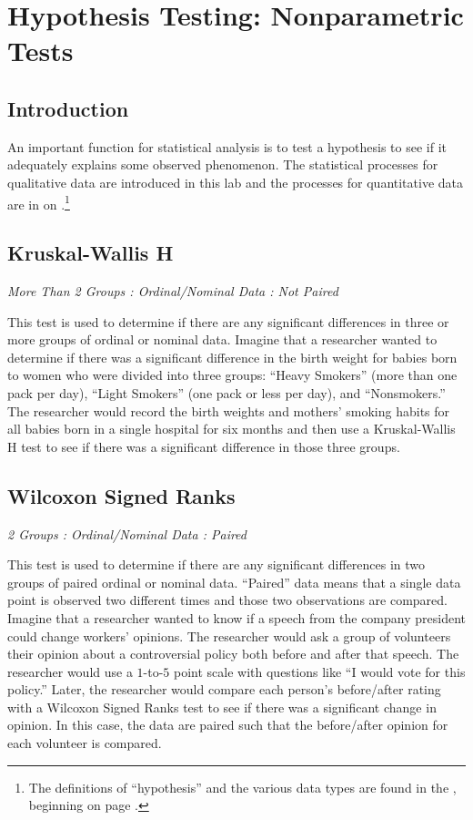\chapter{Hypothesis Testing: Nonparametric Tests}\label{hyp:nonparametric}
\section{Introduction}

An important function for statistical analysis is to test a hypothesis to see if it adequately explains some observed phenomenon. The statistical processes for qualitative data are introduced in this lab and the processes for quantitative data are in  on \pageref{hyp:parametric}.\footnote{The definitions of ``hypothesis'' and the various data types are found in the , beginning on page \pageref{intro:Hypothesis}.} 

\section{Kruskal-Wallis H}

\textit{More Than 2 Groups : Ordinal/Nominal Data : Not Paired}

This test is used to determine if there are any significant differences in three or more groups of ordinal or nominal data. Imagine that a researcher wanted to determine if there was a significant difference in the birth weight for babies born to women who were divided into three groups: ``Heavy Smokers'' (more than one pack per day), ``Light Smokers'' (one pack or less per day), and ``Nonsmokers.'' The researcher would record the birth weights and mothers' smoking habits for all babies born in a single hospital for six months and then use a Kruskal-Wallis H test to see if there was a significant difference in those three groups.

\section{Wilcoxon Signed Ranks} 

\textit{2 Groups : Ordinal/Nominal Data : Paired}

This test is used to determine if there are any significant differences in two groups of paired ordinal or nominal data. ``Paired'' data means that a single data point is observed two different times and those two observations are compared. Imagine that a researcher wanted to know if a speech from the company president could change workers' opinions. The researcher would ask a group of volunteers their opinion about a controversial policy both before and after that speech. The researcher would use a $ 1 $-to-$ 5 $ point scale with questions like ``I would vote for this policy.'' Later, the researcher would compare each person's before/after rating with a Wilcoxon Signed Ranks test to see if there was a significant change in opinion. In this case, the data are paired such that the before/after opinion for each volunteer is compared. 

